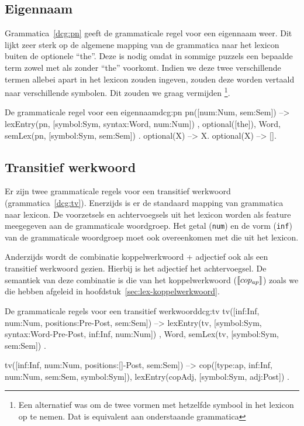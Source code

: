 \subsection{Eigennaam}
Grammatica~\ref{dcg:pn} geeft de grammaticale regel voor een eigennaam weer. Dit lijkt zeer sterk op de algemene mapping van de grammatica naar het lexicon buiten de optionele ``the''. Deze is nodig omdat in sommige puzzels een bepaalde term zowel met als zonder ``the'' voorkomt. Indien we deze twee verschillende termen allebei apart in het lexicon zouden ingeven, zouden deze worden vertaald naar verschillende symbolen. Dit zouden we graag vermijden \footnote{Een alternatief was om de twee vormen met hetzelfde symbool in het lexicon op te nemen. Dat is equivalent aan onderstaande grammatica}.

\begin{dcg}{De grammaticale regel voor een eigennaam}{dcg:pn}
pn([num:Num, sem:Sem]) -->
  { lexEntry(pn, [symbol:Sym, syntax:Word, num:Num]) },
  optional([the]),
  Word,
  { semLex(pn, [symbol:Sym, sem:Sem]) }.
optional(X) -->
  X.
optional(X) -->
  [].
\end{dcg}

\subsection{Transitief werkwoord}
Er zijn twee grammaticale regels voor een transitief werkwoord (grammatica~\ref{dcg:tv}). Enerzijds is er de standaard mapping van grammatica naar lexicon. De voorzetsels en achtervoegsels uit het lexicon worden als feature meegegeven aan de grammaticale woordgroep. Het getal (\texttt{num}) en de vorm (\texttt{inf}) van de grammaticale woordgroep moet ook overeenkomen met die uit het lexicon.

Anderzijds wordt de combinatie koppelwerkwoord + adjectief ook als een transitief werkwoord gezien. Hierbij is het adjectief het achtervoegsel. De semantiek van deze combinatie is die van het koppelwerkwoord ($\llbracket cop_{ap}\rrbracket$) zoals we die hebben afgeleid in hoofdstuk~\ref{sec:lex-koppelwerkwoord}.
\begin{dcg}{De grammaticale regels voor een transitief werkwoord}{dcg:tv}
tv([inf:Inf, num:Num, positions:Pre-Post, sem:Sem]) -->
  { lexEntry(tv, [symbol:Sym, syntax:Word-Pre-Post, inf:Inf, num:Num]) },
  Word,
  { semLex(tv, [symbol:Sym, sem:Sem]) }.

tv([inf:Inf, num:Num, positions:[]-Post, sem:Sem]) -->
  cop([type:ap, inf:Inf, num:Num, sem:Sem, symbol:Sym]),
  { lexEntry(copAdj, [symbol:Sym, adj:Post]) }.
\end{dcg}

